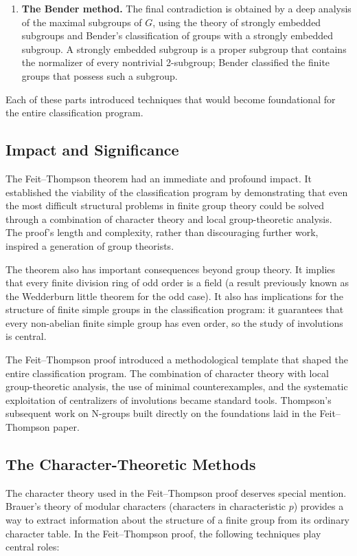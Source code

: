 \begin{enumerate}
\item \textbf{The Bender method.} The final contradiction is obtained by a deep analysis of the maximal subgroups of \(G\), using the theory of strongly embedded subgroups and Bender's classification of groups with a strongly embedded subgroup. A strongly embedded subgroup is a proper subgroup that contains the normalizer of every nontrivial 2-subgroup; Bender classified the finite groups that possess such a subgroup.
\end{enumerate}

Each of these parts introduced techniques that would become foundational for the entire classification program.

\subsection{Impact and Significance}

The Feit--Thompson theorem had an immediate and profound impact. It established the viability of the classification program by demonstrating that even the most difficult structural problems in finite group theory could be solved through a combination of character theory and local group-theoretic analysis. The proof's length and complexity, rather than discouraging further work, inspired a generation of group theorists.

The theorem also has important consequences beyond group theory. It implies that every finite division ring of odd order is a field (a result previously known as the Wedderburn little theorem for the odd case). It also has implications for the structure of finite simple groups in the classification program: it guarantees that every non-abelian finite simple group has even order, so the study of involutions is central.

The Feit--Thompson proof introduced a methodological template that shaped the entire classification program. The combination of character theory with local group-theoretic analysis, the use of minimal counterexamples, and the systematic exploitation of centralizers of involutions became standard tools. Thompson's subsequent work on N-groups built directly on the foundations laid in the Feit--Thompson paper.

\subsection{The Character-Theoretic Methods}

The character theory used in the Feit--Thompson proof deserves special mention. Brauer's theory of modular characters (characters in characteristic \(p\)) provides a way to extract information about the structure of a finite group from its ordinary character table. In the Feit--Thompson proof, the following techniques play central roles:

